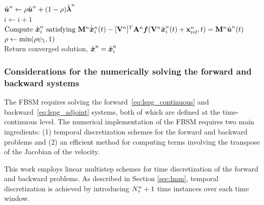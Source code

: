 \begin{algorithm}
{%
${\hat{\boldsymbol u}^{n}}  \leftarrow \rho {\hat{\boldsymbol u}^{n}} + (1 - \rho) \hat{\boldsymbol \lambda}^{n}$ \\
$i \leftarrow i+1$ \\
$\text{Compute }\hat{ \boldsymbol x}^{n}_i \text{ satisfying } \mathbf{M}^{n} \dot{\hat{ \boldsymbol x}}^{n}_i(t)   -  [\mathbf {V}^{n}]^T \mathbf{A}^{n} \boldsymbol f(\mathbf {V}^{n} \hat{ \boldsymbol x}^n_i(t) + \mathbf{x}_\text{ref}^{n},t) = \mathbf{M}^{n} \hat{\boldsymbol u}^{n}(t) $
\\
{
$\rho \leftarrow \text{min}(\rho \psi_1,1)$ \\
}
}
Return converged solution, $\hat{ \boldsymbol x}^{n}= \hat{ \boldsymbol x}^{n}_i$
\end{algorithm}
\subsubsection{Considerations for the numerically solving the forward and
backward systems}
The FBSM requires solving the forward~\eqref{eq:lspg_continuous} and
backward~\eqref{eq:lspg_adjoint} systems, both of which are defined at the time-continuous level. 
The numerical implementation of the FBSM requires two main ingredients: (1) temporal discretization schemes for the forward and backward problems and (2) 
an efficient method for computing terms involving the transpose of the
Jacobian of the velocity.

This work employs linear multistep schemes for time discretization of the
forward and backward problems. As described in Section \ref{sec:lmm},
temporal discretization is achieved by introducing $N_{\tau}^{n} + 1$ time
instances over each time window.

